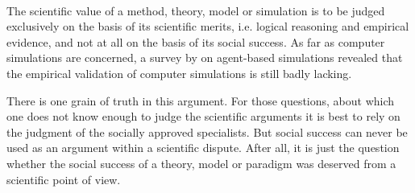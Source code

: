 \documentclass[graybox, English]{svmult}
\begin{document}
\

 The scientific value of a method, theory,
model or simulation is to be judged exclusively on the basis of its
scientific merits, i.e. logical reasoning and empirical evidence, and
not at all on the basis of its social success. As far as computer
simulations are concerned, a survey by \citet{heath-et-al:2009} on
agent-based simulations revealed that the empirical validation of
computer simulations is still badly lacking.

There is one grain of truth in this argument. For those questions, about
which one does not know enough to judge the scientific arguments
it is best to rely on the judgment of the socially approved
specialists. But social success can never be used as an argument within
a scientific dispute. After all, it is just the question whether the social
success of a theory, model or paradigm was deserved from a scientific point of view.





\end{document}
